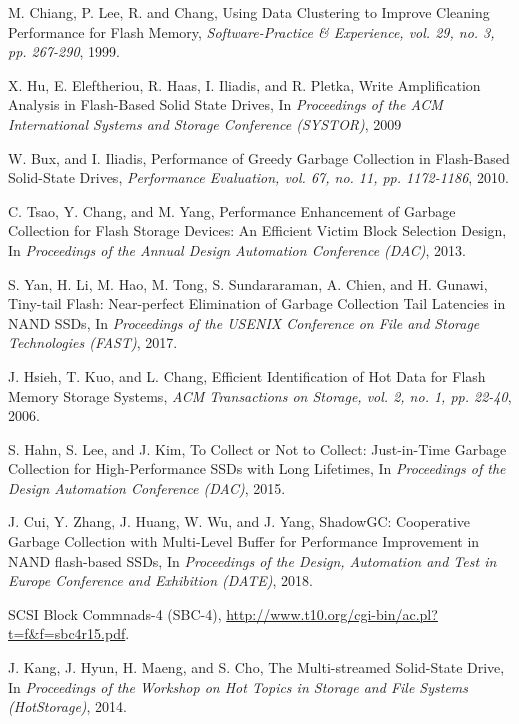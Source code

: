 \newpage


\begin{thebibliography}{00}

M. Chiang, P. Lee, R. and Chang,
Using Data Clustering to Improve Cleaning Performance for Flash Memory,
\textit{Software-Practice \& Experience, vol. 29, no. 3, pp. 267-290}, 1999.

X. Hu, E. Eleftheriou, R. Haas, I. Iliadis, and R. Pletka,
Write Amplification Analysis in Flash-Based Solid State Drives,
In \textit{Proceedings of the ACM International Systems and Storage Conference (SYSTOR)}, 2009

W. Bux, and I. Iliadis,
Performance of Greedy Garbage Collection in Flash-Based Solid-State Drives,
\textit{Performance Evaluation, vol. 67, no. 11, pp. 1172-1186}, 2010.

C. Tsao, Y. Chang, and M. Yang,
Performance Enhancement of Garbage Collection for Flash Storage Devices: 
An Efficient Victim Block Selection Design,
In \textit{Proceedings of the Annual Design Automation Conference (DAC)}, 2013.

S. Yan, H. Li, M. Hao, M. Tong, S. Sundararaman, A. Chien, and H. Gunawi,
Tiny-tail Flash: Near-perfect Elimination of Garbage Collection Tail Latencies in NAND SSDs,
In \textit{Proceedings of the USENIX Conference on File and Storage Technologies (FAST)}, 2017.

J. Hsieh, T. Kuo, and L. Chang,
Efficient Identification of Hot Data for Flash Memory Storage Systems,
\textit{ACM Transactions on Storage, vol. 2, no. 1, pp. 22-40}, 2006.

S. Hahn, S. Lee, and J. Kim,
To Collect or Not to Collect: Just-in-Time Garbage Collection for High-Performance SSDs with Long Lifetimes,
In \textit{Proceedings of the Design Automation Conference (DAC)}, 2015.

J. Cui, Y. Zhang, J. Huang, W. Wu, and J. Yang,
ShadowGC: Cooperative Garbage Collection with Multi-Level Buffer for Performance Improvement 
in NAND flash-based SSDs,
In \textit{Proceedings of the Design, Automation and Test in Europe Conference and Exhibition (DATE)}, 2018.

SCSI Block Commnads-4 (SBC-4),
\url{http://www.t10.org/cgi-bin/ac.pl?t=f&f=sbc4r15.pdf}.

J. Kang, J. Hyun, H. Maeng, and S. Cho,
The Multi-streamed Solid-State Drive,
In \textit{Proceedings of the Workshop on Hot Topics in Storage and File Systems (HotStorage)}, 2014.


\end{thebibliography}

